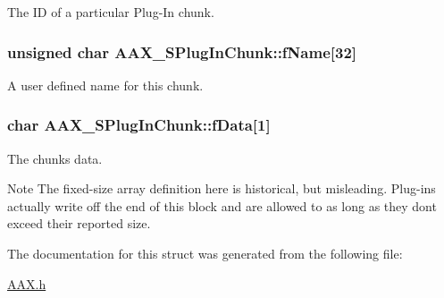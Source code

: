 The I\+D of a particular Plug-\/\+In chunk. 

\hypertarget{a00125_a1b07e29358b5549739f674e04653a6bc}{}
\subsubsection[{f\+Name}]{\setlength{\rightskip}{0pt plus 5cm}unsigned char A\+A\+X\+\_\+\+S\+Plug\+In\+Chunk\+::f\+Name\mbox{[}32\mbox{]}}\label{a00125_a1b07e29358b5549739f674e04653a6bc}


A user defined name for this chunk. 

\hypertarget{a00125_abc76d66fffa4a59ee5cfdbdd992c532c}{}
\subsubsection[{f\+Data}]{\setlength{\rightskip}{0pt plus 5cm}char A\+A\+X\+\_\+\+S\+Plug\+In\+Chunk\+::f\+Data\mbox{[}1\mbox{]}}\label{a00125_abc76d66fffa4a59ee5cfdbdd992c532c}


The chunk\textquotesingle{}s data. 

\begin{DoxyNote}{Note}
The fixed-\/size array definition here is historical, but misleading. Plug-\/ins actually write off the end of this block and are allowed to as long as they don\textquotesingle{}t exceed their reported size. 
\end{DoxyNote}


The documentation for this struct was generated from the following file\+:\begin{DoxyCompactItemize}
\item 
\hyperlink{a00149}{A\+A\+X.\+h}\end{DoxyCompactItemize}
